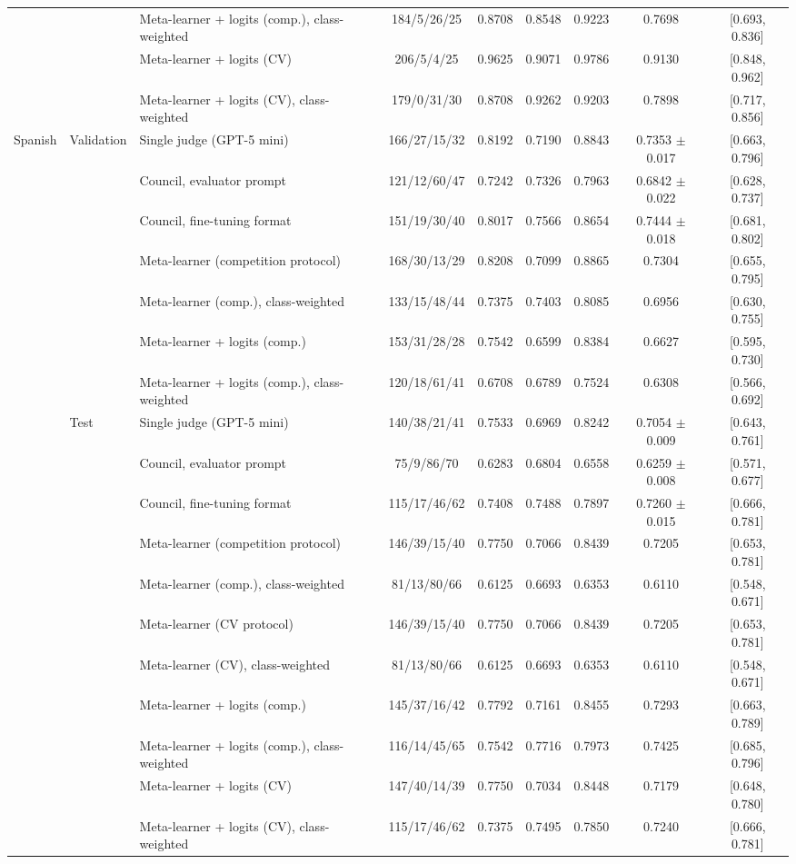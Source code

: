 \begin{tabular}{lllcccccc}
 &  & Meta-learner + logits (comp.), class-weighted & 184/5/26/25 & 0.8708 & 0.8548 & 0.9223 & 0.7698 & [0.693, 0.836] \\
 &  & Meta-learner + logits (CV) & 206/5/4/25 & 0.9625 & 0.9071 & 0.9786 & 0.9130 & [0.848, 0.962] \\
 &  & Meta-learner + logits (CV), class-weighted & 179/0/31/30 & 0.8708 & 0.9262 & 0.9203 & 0.7898 & [0.717, 0.856] \\
\hline
Spanish & Validation & Single judge (GPT-5 mini) & 166/27/15/32 & 0.8192 & 0.7190 & 0.8843 & 0.7353 $\pm$ 0.017 & [0.663, 0.796] \\
 &  & Council, evaluator prompt & 121/12/60/47 & 0.7242 & 0.7326 & 0.7963 & 0.6842 $\pm$ 0.022 & [0.628, 0.737] \\
 &  & Council, fine-tuning format & 151/19/30/40 & 0.8017 & 0.7566 & 0.8654 & 0.7444 $\pm$ 0.018 & [0.681, 0.802] \\
 &  & Meta-learner (competition protocol) & 168/30/13/29 & 0.8208 & 0.7099 & 0.8865 & 0.7304 & [0.655, 0.795] \\
 &  & Meta-learner (comp.), class-weighted & 133/15/48/44 & 0.7375 & 0.7403 & 0.8085 & 0.6956 & [0.630, 0.755] \\
 &  & Meta-learner + logits (comp.) & 153/31/28/28 & 0.7542 & 0.6599 & 0.8384 & 0.6627 & [0.595, 0.730] \\
 &  & Meta-learner + logits (comp.), class-weighted & 120/18/61/41 & 0.6708 & 0.6789 & 0.7524 & 0.6308 & [0.566, 0.692] \\
 & Test & Single judge (GPT-5 mini) & 140/38/21/41 & 0.7533 & 0.6969 & 0.8242 & 0.7054 $\pm$ 0.009 & [0.643, 0.761] \\
 &  & Council, evaluator prompt & 75/9/86/70 & 0.6283 & 0.6804 & 0.6558 & 0.6259 $\pm$ 0.008 & [0.571, 0.677] \\
 &  & Council, fine-tuning format & 115/17/46/62 & 0.7408 & 0.7488 & 0.7897 & 0.7260 $\pm$ 0.015 & [0.666, 0.781] \\
 &  & Meta-learner (competition protocol) & 146/39/15/40 & 0.7750 & 0.7066 & 0.8439 & 0.7205 & [0.653, 0.781] \\
 &  & Meta-learner (comp.), class-weighted & 81/13/80/66 & 0.6125 & 0.6693 & 0.6353 & 0.6110 & [0.548, 0.671] \\
 &  & Meta-learner (CV protocol) & 146/39/15/40 & 0.7750 & 0.7066 & 0.8439 & 0.7205 & [0.653, 0.781] \\
 &  & Meta-learner (CV), class-weighted & 81/13/80/66 & 0.6125 & 0.6693 & 0.6353 & 0.6110 & [0.548, 0.671] \\
 &  & Meta-learner + logits (comp.) & 145/37/16/42 & 0.7792 & 0.7161 & 0.8455 & 0.7293 & [0.663, 0.789] \\
 &  & Meta-learner + logits (comp.), class-weighted & 116/14/45/65 & 0.7542 & 0.7716 & 0.7973 & 0.7425 & [0.685, 0.796] \\
 &  & Meta-learner + logits (CV) & 147/40/14/39 & 0.7750 & 0.7034 & 0.8448 & 0.7179 & [0.648, 0.780] \\
 &  & Meta-learner + logits (CV), class-weighted & 115/17/46/62 & 0.7375 & 0.7495 & 0.7850 & 0.7240 & [0.666, 0.781] \\
\hline
\end{tabular}
